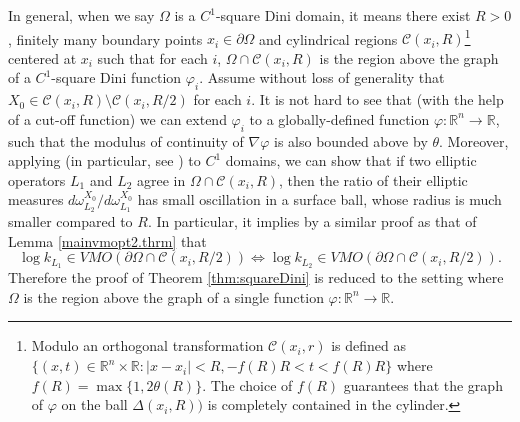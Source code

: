\documentclass[11pt, a4paper,leqno]{amsart}
\theoremstyle{plain}
\theoremstyle{definition}
\theoremstyle{remark}
\numberwithin{equation}{section}
\newcommand{\RR}{{\mathbb{R}}}
\begin{document}
In general, when we say $\Omega$ is a $C^1$-square Dini domain, it means there exist $R>0$, finitely many boundary points $x_i \in \partial\Omega$ and cylindrical regions $\mathcal{C}(x_i, R)$\footnote{Modulo an orthogonal transformation $\mathcal{C}(x_i, r)$ is defined as $\{(x,t) \in \RR^n \times \RR: |x-x_i|< R, -f(R) R < t < f(R) R \}$ where $f(R) = \max\{1, 2\theta(R)\}$. The choice of $f(R)$ guarantees that the graph of $\varphi $ on the ball $\Delta(x_i, R))$ is completely contained in the cylinder.} centered at $x_i$ such that for each $i$, $\Omega \cap \mathcal{C}(x_i, R)$ is the region above the graph of a $C^1$-square Dini function $\varphi_i$. Assume without loss of generality that $X_0 \in \mathcal{C}(x_i, R) \setminus \mathcal{C}(x_i, R/2)$ for each $i$. It is not hard to see that (with the help of a cut-off function) we can extend $\varphi_i$ to a globally-defined function $\varphi: \RR^n \to \RR$, such that the modulus of continuity of $\nabla\varphi$ is also bounded above by $\theta$. Moreover, applying \cite[Lemma 5.1]{BTZ} (in particular, see \cite[Remark 5.11]{BTZ}) to $C^1$ domains, we can show that if two elliptic operators $L_1$ and $L_2$ agree in $\Omega \cap \mathcal{C}(x_i, R)$, then the ratio of their elliptic measures $d\omega_{L_2}^{X_0}/d\omega_{L_1}^{X_0}$ has small oscillation in a surface ball, whose radius is much smaller compared to $R$. In particular, it implies by a similar proof as that of Lemma \ref{mainvmopt2.thrm} that
\begin{equation}\label{eq:logVMO}
	\log k_{L_1} \in VMO(\partial\Omega \cap \mathcal{C}(x_i, R/2)) \iff \log k_{L_2} \in VMO(\partial\Omega \cap \mathcal{C}(x_i, R/2)). 
\end{equation} 
Therefore the proof of Theorem \ref{thm:squareDini} is reduced to the setting where $\Omega$ is the region above the graph of a single function $\varphi: \RR^n \to \RR$.
\end{document}
